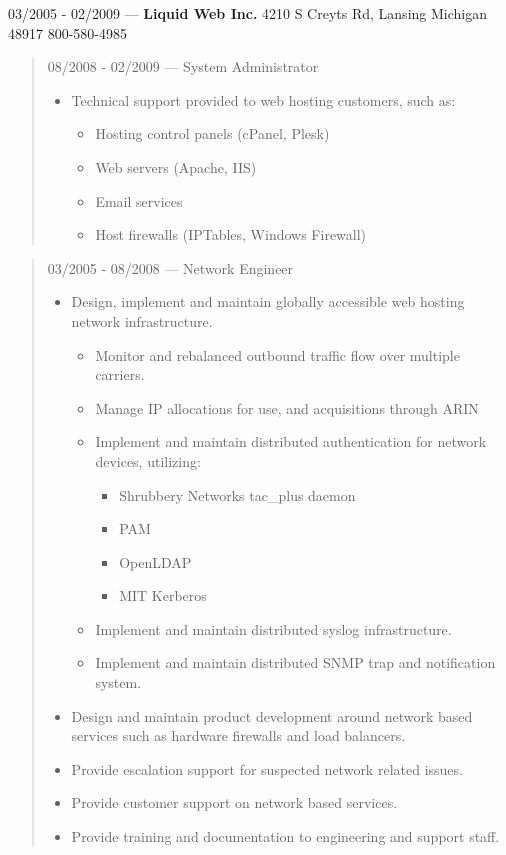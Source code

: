03/2005 - 02/2009 --- {\bf Liquid Web Inc.} 4210 S Creyts Rd, Lansing Michigan 48917 800-580-4985
\begin{quote}
08/2008 - 02/2009 --- System Administrator\\
\begin{itemize}
\item Technical support provided to web hosting customers, such as:
\begin{itemize}
\item Hosting control panels (cPanel, Plesk)
\item Web servers (Apache, IIS)
\item Email services
\item Host firewalls (IPTables, Windows Firewall)
\end{itemize}
\end{itemize}
\end{quote}
\begin{quote}
03/2005 - 08/2008 --- Network Engineer\\
\begin{itemize}
\item Design, implement and maintain globally accessible web hosting
network infrastructure.
\begin{itemize}
\item Monitor and rebalanced outbound traffic flow over multiple
carriers.
\item Manage IP allocations for use, and acquisitions through ARIN
\item Implement and maintain distributed authentication for network
devices, utilizing:
\begin{itemize}
\item Shrubbery Networks tac\_plus daemon
\item PAM
\item OpenLDAP
\item MIT Kerberos
\end{itemize}
\item Implement and maintain distributed syslog infrastructure.
\item Implement and maintain distributed SNMP trap and notification
system.
\end{itemize}
\item Design and maintain product development around network based services
such as hardware firewalls and load balancers.
\item Provide escalation support for suspected network related issues.
\item Provide customer support on network based services.
\item Provide training and documentation to engineering and support staff.
\end{itemize}
\end{quote}
